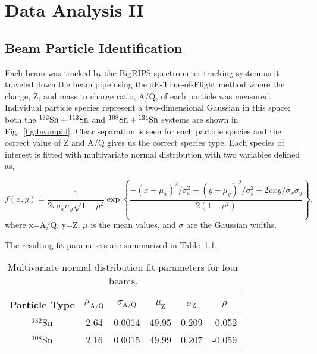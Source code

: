 \chapter{Data Analysis II}

\section{Beam Particle Identification}

Each beam  was tracked by the BigRIPS spectrometer tracking system as it traveled down the beam pipe using the dE-Time-of-Flight method where the charge, Z, and mass to charge ratio, A/Q, of each particle was measured. Individual particle species represent a two-dimensional Gaussian in this space; both the ${}^{132}\mathrm{Sn} + {}^{112}\mathrm{Sn}$ and ${}^{108}\mathrm{Sn} + {}^{124}\mathrm{Sn}$ systems are shown in Fig.~\ref{fig:beampid}. Clear separation is seen for each particle species and the correct value of Z and A/Q gives us the correct species type. Each species of interest is fitted with multivariate normal distribution with two variables defined as,

\begin{equation}
  f(x,y)=\frac1{2\pi\sigma_x\sigma_y\sqrt{1-\rho^2}}\exp\left\{
  \frac{-(x - \mu_{x})^2/\sigma_x^2-(y-\mu_{y})^2/\sigma_y^2+2\rho
  xy/\sigma_x\sigma_y}{2(1-\rho^2)}\right\},
   \label{multiGauss}
\end{equation}
where x=A/Q, y=Z, $\mu$ is the mean values, and $\sigma$ are the Gaussian widths. 

The resulting fit parameters are summarized in Table~\ref{beamParameters}. 
\begin{table}[H]
  \begin{center}
    \begin{tabular}{cccccc}
      \hline 
      Particle Type & $\mu_\mathrm{A/Q}$ & $\sigma_\mathrm{A/Q}$ & $\mu_\mathrm{Z}$ &
      $\sigma_\mathrm{Z}$ & $\rho$\\
      \hline\hline 
      ${}^{132}$Sn & 2.64 & 0.0014 & 49.95 & 0.209 & -0.052 \\
      ${}^{108}$Sn & 2.16 & 0.0015 & 49.99 & 0.207 & -0.059 \\
      \hline
    \end{tabular}
    \caption{Multivariate normal distribution fit parameters for four beams.
    \label{beamParameters}}
  \end{center}
\end{table}

